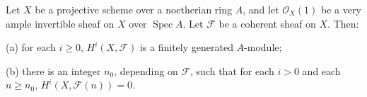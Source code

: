 Let $X$ be a projective scheme over a noetherian ring $A$, and let $\mathcal{O}_X(1)$ be a very ample invertible sheaf on $X$ over $\operatorname{Spec} A$. Let $\mathcal{F}$ be a coherent sheaf on $X$. Then:

(a) for each $i \geq 0$, $H^i(X, \mathcal{F})$ is a finitely generated $A$-module;

(b) there is an integer $n_0$, depending on $\mathcal{F}$, such that for each $i > 0$ and each $n \geq n_0$, $H^i(X, \mathcal{F}(n)) = 0$.
